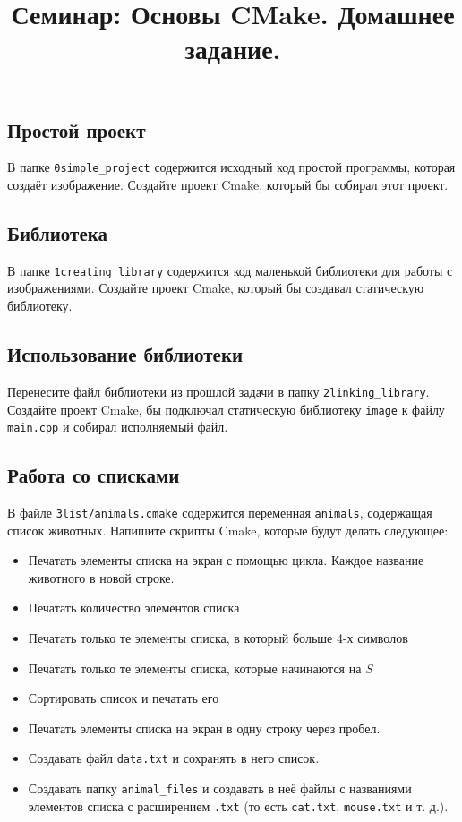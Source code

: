 \documentclass{article}
\begin{document}
\title{Семинар: Основы CMake. Домашнее задание.\vspace{-5ex}}\date{}\maketitle
\subsection{Простой проект}
В папке \texttt{0simple\_project} содержится исходный код простой программы, которая создаёт изображение. Создайте проект Cmake, который бы собирал этот проект.

\subsection{Библиотека}
В папке \texttt{1creating\_library} содержится код маленькой библиотеки для работы с изображениями.
Создайте проект Cmake, который бы создавал статическую библиотеку.

\subsection{Использование библиотеки}
Перенесите файл библиотеки из прошлой задачи в папку \texttt{2linking\_library}. Создайте проект Cmake, бы подключал статическую библиотеку \texttt{image} к файлу \texttt{main.cpp} и собирал исполняемый файл.

\subsection{Работа со списками}
В файле \texttt{3list/animals.cmake} содержится переменная \texttt{animals}, содержащая список животных. Напишите скрипты Cmake, которые будут делать следующее:
\begin{itemize}
\item Печатать элементы списка на экран с помощью цикла. Каждое название животного в новой строке.
\item Печатать количество элементов списка
\item Печатать только те элементы списка, в который больше 4-х символов
\item Печатать только те элементы списка, которые начинаются на \textit{S}
\item Сортировать список и печатать его
\item Печатать элементы списка на экран в одну строку через пробел.
\item Создавать файл \texttt{data.txt} и сохранять в него список.
\item Создавать папку \texttt{animal\_files} и создавать в неё файлы с названиями элементов списка с расширением \texttt{.txt} (то есть \texttt{cat.txt}, \texttt{mouse.txt} и т. д.).
\end{itemize}
\end{document}
